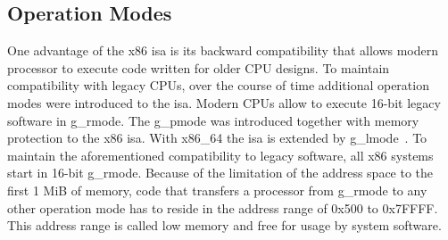 \subsection{Operation Modes}
\label{sec:state:technical:modes}
One advantage of the x86 \gls{isa} is its backward compatibility that allows
modern processor to execute code written for older CPU designs. To maintain
compatibility with legacy CPUs, over the course of time additional operation
modes were introduced to the \gls{isa}. Modern CPUs allow to execute 16-bit
legacy software in \gls{g_rmode}. The \gls{g_pmode} was introduced together with
memory protection to the x86 \gls{isa}. With x86\_64 the \gls{isa} is extended
by \gls{g_lmode}~\cite{intel_sdm}. To maintain the aforementioned compatibility
to legacy software, all x86 systems start in 16-bit \gls{g_rmode}. Because of
the limitation of the address space to the first 1 MiB of memory, code that
transfers a processor from \gls{g_rmode} to any other operation mode has to
reside in the address range of 0x500 to 0x7FFFF. This address range is called
low memory and free for usage by system software.


